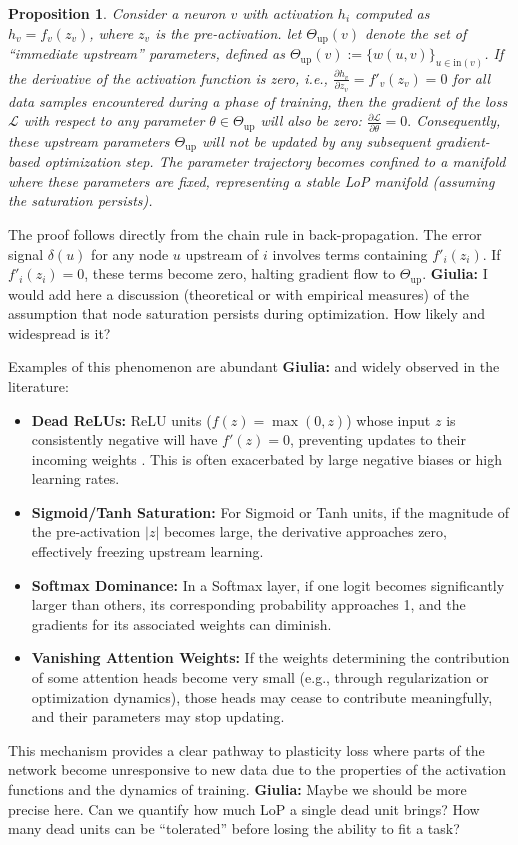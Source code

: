 \documentclass{article}
\newcommand{\Loss}{\mathcal{L}}
\newcommand{\giulia}[1]{{\color{ForestGreen}\textbf{Giulia:} #1}}
\newcommand{\ff}[1]{\todo[color=blue!30,size=\tiny]{FF: #1}}
\newtheorem{proposition}{Proposition}[section]
\begin{document}
\begin{proposition}
\label{prop:saturated}
Consider a neuron $v$ with activation $h_i$ computed as $h_v = f_v(z_v)$, where $z_v$ is the pre-activation. let $\Theta_{\text{up}}(v)$ denote the set of ``immediate upstream'' parameters, defined as ${\Theta_{\text{up}}(v):=\{w(u,v)\}_{u\in \text{in}(v)}}$. If the derivative of the activation function is zero, i.e.,
\(
\frac{\partial h_v}{\partial z_v} = f'_v(z_v) = 0
\)
for all data samples encountered during a phase of training, then the gradient of the loss $\Loss$ with respect to any parameter $\theta \in \Theta_{\text{up}}$ will also be zero:
\(
\frac{\partial\Loss}{\partial\theta} = 0.
\)
Consequently, these upstream parameters $\Theta_{\text{up}}$ will not be updated by any subsequent gradient-based optimization step.  The parameter trajectory becomes confined to a manifold where these parameters are fixed, representing a stable LoP manifold (assuming the saturation persists).
\end{proposition}

The proof follows directly from the chain rule in back-propagation. The error signal $\delta(u)$ for any node $u$ upstream of $i$ involves terms containing $f'_i(z_i)$. If $f'_i(z_i)=0$, these terms become zero, halting gradient flow to $\Theta_{\text{up}}$. \giulia{I would add here a discussion (theoretical or with empirical measures) of the assumption that node saturation persists during optimization. How likely and widespread is it?}

Examples of this phenomenon are abundant \giulia{and widely observed in the literature}\ff{these cases are well known, can we add more citations?}:
\begin{itemize}
    \item \textbf{Dead ReLUs:} ReLU units ($f(z) = \max(0, z)$) whose input $z$ is consistently negative will have $f'(z)=0$, preventing updates to their incoming weights \citep{nair2010rectified}. This is often exacerbated by large negative biases or high learning rates.
    \item \textbf{Sigmoid/Tanh Saturation:} For Sigmoid or Tanh units, if the magnitude of the pre-activation $|z|$ becomes large, the derivative approaches zero, effectively freezing upstream learning.
    \item \textbf{Softmax Dominance:} In a Softmax layer, if one logit becomes significantly larger than others, its corresponding probability approaches 1, and the gradients for its associated weights can diminish.
    \item \textbf{Vanishing Attention Weights:} If the weights determining the contribution of some attention heads become very small (e.g., through regularization or optimization dynamics), those heads may cease to contribute meaningfully, and their parameters may stop updating.
\end{itemize}
This mechanism provides a clear pathway to plasticity loss where parts of the network become unresponsive to new data due to the properties of the activation functions and the dynamics of training. \giulia{Maybe we should be more precise here. Can we quantify how much LoP a single dead unit brings? How many dead units can be ``tolerated'' before losing the ability to fit a task?}
\end{document}
